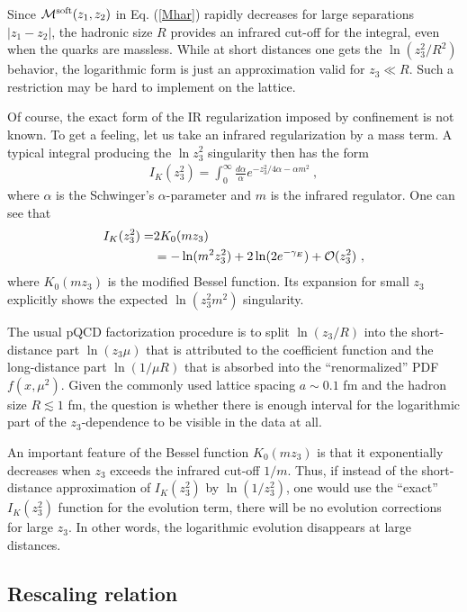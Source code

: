 Since   ${\cal  M}^{\rm  soft} (z_1,z_2)$ in Eq. (\ref{Mhar})
rapidly decreases for large separations
$|z_1-z_2|$,  the hadronic size $R$  provides an infrared cut-off for the integral,
even when the quarks are massless.  While at   short distances   one   gets  the
 $\ln (z_3^2 / R^2)$ behavior,   the logarithmic form  is just an approximation
valid for $z_3 \ll R$. Such
a restriction may be hard to implement on the lattice.


 Of course, the exact form of the IR regularization  imposed
by confinement is not known. To get  a feeling,
 let us take an infrared regularization by a  mass term.
 A typical integral producing the  $\ln z_3^2$  singularity then  has the form
   \begin{align}
  I_K (z_3^2) = \int_0^\infty \frac{d\alpha}{\alpha} e^{-z_3^2/4\alpha -   \alpha m^2} \ ,
  \label{IK}
     \end{align}
where $\alpha$ is the Schwinger's $\alpha$-parameter and $m$ is the infrared  regulator.
 One can see that
   \begin{align}
  I_K (z_3^2) = &2 K_0 (mz_3) \nonumber \\  & = - \ln (m^2 z_3^2) + 2 \ln (2e^{-  \gamma_E })+ {\cal O} (z_3^2)  \  ,
  \label{Kexp}
     \end{align}
where $K_0(mz_3)$ is the modified Bessel function.  Its expansion for small $z_3$
explicitly  shows the expected $\ln (z_3^2 m^2)$ singularity.


The usual pQCD factorization   procedure   is to split
$\ln (z_3/ R)$ into the short-distance part $\ln (z_3 \mu)$   that is attributed  to
 the coefficient function  and the long-distance part $\ln ( 1/ \mu R )$
that is   absorbed into the ``renormalized'' PDF $f(x,\mu^2)$.
Given the commonly used   lattice   spacing $a\sim 0.1$ fm  and the hadron size
$R \lesssim 1$ fm, the question is whether  there is enough interval
for the logarithmic part
of the \mbox{$z_3$-dependence} to   be visible  in the  data  at all.

An important feature of the Bessel  function $K_0 (mz_3)$ is that it
  exponentially decreases when
$z_3$  exceeds the infrared cut-off $1/m$.
Thus, if   instead of the  short-distance approximation of
$I_K(z_3^2)$ by $\ln (1/z_3^2)$,
one would use the ``exact'' $I_K(z_3^2)$ function
for the evolution term,
 there will be no evolution corrections for large $z_3$.
In other words, the logarithmic
evolution disappears at large distances.



\subsection{Rescaling relation}

